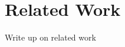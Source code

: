 \chapter{Related Work}\label{ch:related_work}

Write up on related work

\cite{barton2003ubiwise}


\cite{o2005testbed}